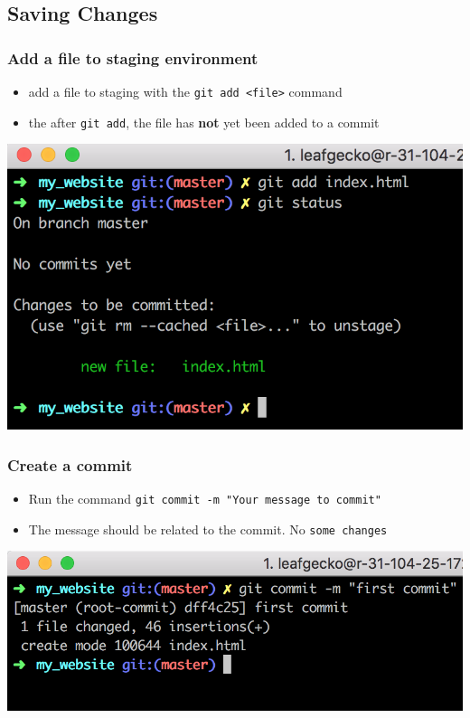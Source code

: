 \documentclass[12pt]{beamer}
\begin{document}
\subsection{Saving Changes}
\begin{frame}
\frametitle{Add a file to staging environment}

\begin{itemize}
	\item add a file to staging with the \texttt{git add <file>} command
	\item the after \texttt{git add}, the file has \textbf{not} yet been added to a commit
\end{itemize}
\begin{center}
	\includegraphics[width=0.7\linewidth]{git_add_screenshot}
\end{center}
\end{frame}

\begin{frame}
\frametitle{Create a commit}
\begin{itemize}
	\item Run the command \texttt{git commit -m "Your message to commit"}
	\item The message should be related to the commit. No \texttt{some changes}
\end{itemize}
\begin{center}
	\includegraphics[width=0.7\linewidth]{git_commit_screenshot}
\end{center}
\end{frame}
\end{document}
